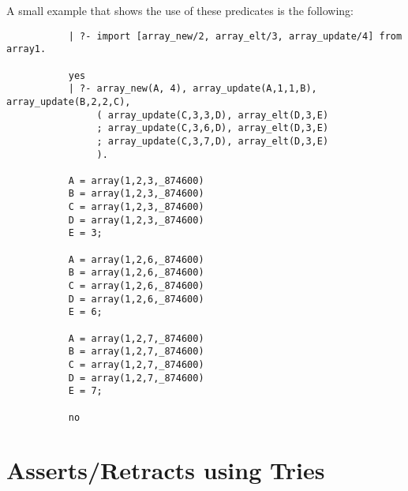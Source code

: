 A small example that shows the use of these predicates is the following:
{\footnotesize
 \begin{verbatim}
           | ?- import [array_new/2, array_elt/3, array_update/4] from array1.

           yes
           | ?- array_new(A, 4), array_update(A,1,1,B), array_update(B,2,2,C),
                ( array_update(C,3,3,D), array_elt(D,3,E)
                ; array_update(C,3,6,D), array_elt(D,3,E)
                ; array_update(C,3,7,D), array_elt(D,3,E)
                ).

           A = array(1,2,3,_874600)
           B = array(1,2,3,_874600)
           C = array(1,2,3,_874600)
           D = array(1,2,3,_874600)
           E = 3;

           A = array(1,2,6,_874600)
           B = array(1,2,6,_874600)
           C = array(1,2,6,_874600)
           D = array(1,2,6,_874600)
           E = 6;

           A = array(1,2,7,_874600)
           B = array(1,2,7,_874600)
           C = array(1,2,7,_874600)
           D = array(1,2,7,_874600)
           E = 7;

           no
 \end{verbatim}
}





%
\section{Asserts/Retracts using Tries }

